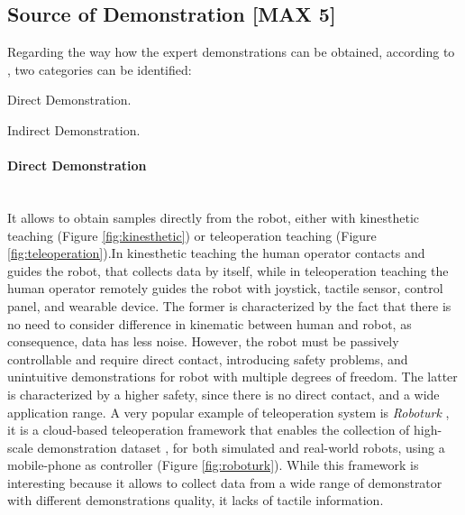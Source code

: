 \subsection{Source of Demonstration [MAX 5]}
\label{sec:source_of_demonstration}
Regarding the way how the expert demonstrations can be obtained, according to \cite{fang2019survey}, two categories can be identified: \begin{enumerate*}[label=\textbf{(\alph*)}]
    \item Direct Demonstration. 
    \item Indirect Demonstration.
\end{enumerate*}

\paragraph{Direct Demonstration}  \mbox{} \\
It allows to obtain samples directly from the robot, either with kinesthetic teaching (Figure \ref{fig:kinesthetic}) or teleoperation teaching (Figure \ref{fig:teleoperation}).In kinesthetic teaching the human operator contacts and guides the robot, that collects data by itself, while in teleoperation teaching the human operator remotely guides the robot with joystick, tactile sensor, control panel, and wearable device. 
The former is characterized by the fact that there is no need to consider difference in kinematic between human and robot, as consequence, data has less noise. However, the robot must be passively controllable and require direct contact, introducing safety problems, and unintuitive demonstrations for robot with multiple degrees of freedom.
The latter is characterized by a higher safety, since there is no direct contact, and a wide application range.
A very popular example of teleoperation system is \textit{Roboturk} \cite{mandlekar2018roboturk}, it is a cloud-based teleoperation framework that enables the collection of high-scale demonstration dataset \cite{mandlekar2019scaling,mandlekar2022matters}, for both simulated and real-world robots, using a mobile-phone as controller (Figure \ref{fig:roboturk}). 
While this framework is interesting because it allows to collect data from a wide range of demonstrator with different demonstrations quality, it lacks of tactile information.


